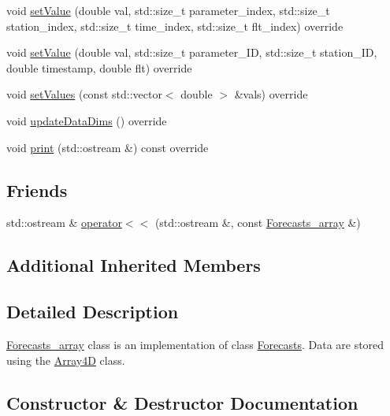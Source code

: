 \begin{DoxyCompactItemize}
\item 
void \mbox{\hyperlink{class_forecasts__array_a19d59c93e8b7692ebae2d3e15dc43f87}{set\+Value}} (double val, std\+::size\+\_\+t parameter\+\_\+index, std\+::size\+\_\+t station\+\_\+index, std\+::size\+\_\+t time\+\_\+index, std\+::size\+\_\+t flt\+\_\+index) override
\item 
void \mbox{\hyperlink{class_forecasts__array_a7224d8333630fcd162a1b69b49241d2f}{set\+Value}} (double val, std\+::size\+\_\+t parameter\+\_\+\+ID, std\+::size\+\_\+t station\+\_\+\+ID, double timestamp, double flt) override
\item 
void \mbox{\hyperlink{class_forecasts__array_af31e7741f2e048593cbec1c317210b65}{set\+Values}} (const std\+::vector$<$ double $>$ \&vals) override
\item 
void \mbox{\hyperlink{class_forecasts__array_ab3fc780bb6a5cbf132457c8c336bc777}{update\+Data\+Dims}} () override
\item 
void \mbox{\hyperlink{class_forecasts__array_a56985347f516340034b29dc4cdda87b1}{print}} (std\+::ostream \&) const override
\end{DoxyCompactItemize}
\subsection*{Friends}
\begin{DoxyCompactItemize}
\item 
std\+::ostream \& \mbox{\hyperlink{class_forecasts__array_a6bde933a6e00ad1328f834e4f5d98606}{operator$<$$<$}} (std\+::ostream \&, const \mbox{\hyperlink{class_forecasts__array}{Forecasts\+\_\+array}} \&)
\end{DoxyCompactItemize}
\subsection*{Additional Inherited Members}


\subsection{Detailed Description}
\mbox{\hyperlink{class_forecasts__array}{Forecasts\+\_\+array}} class is an implementation of class \mbox{\hyperlink{class_forecasts}{Forecasts}}. Data are stored using the \mbox{\hyperlink{class_array4_d}{Array4D}} class. 

\subsection{Constructor \& Destructor Documentation}
\mbox{\label{class_forecasts__array_a4304d0d78a0c475b3392c99e14c0891b}} 
